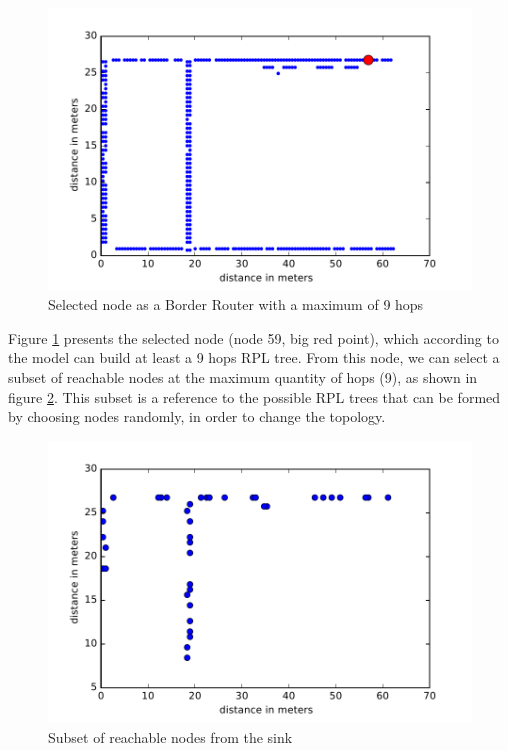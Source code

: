 \begin{figure}[]
	\centering
	\includegraphics[width=0.8 \columnwidth]{chapters/calpulli.images/grenoble-sink-node.pdf}
	\caption{Selected node as a Border Router with a maximum of 9 hops} \label{fig:GrenobleSinkNode}
\end{figure}

Figure \ref{fig:GrenobleSinkNode} presents the selected node (node 59, big red point), which according to the model can build at least a 9 hops RPL tree.
From this node, we can select a subset of reachable nodes at the maximum quantity of hops (9), as shown in figure \ref{fig:GrenobleReachable}.
This subset is a reference to the possible RPL trees that can be formed by choosing nodes randomly, in order to change the topology.

\begin{figure}[]
	\centering
	\includegraphics[width=0.8 \columnwidth]{chapters/calpulli.images/grenoble-reachable-m3.pdf}
	\caption{Subset of reachable nodes from the sink} \label{fig:GrenobleReachable}
\end{figure}

